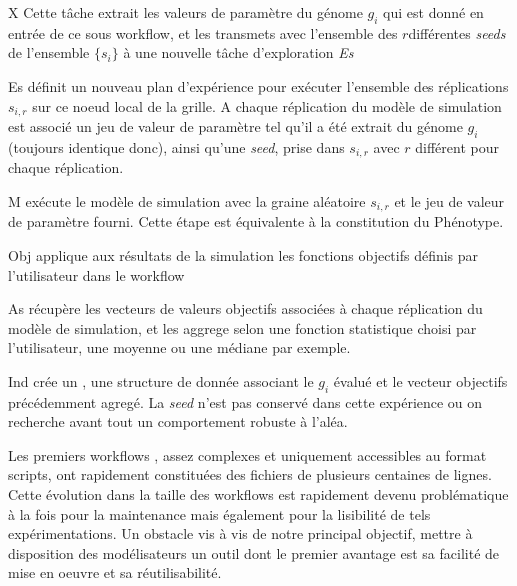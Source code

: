 \begin{myitemize}

\item[X] Cette tâche extrait les valeurs de paramètre du génome $g_i$ qui est donné en entrée de ce sous workflow, et les transmets avec l'ensemble des $r$différentes \textit{seeds} de l'ensemble $\{s_i\}$ à une nouvelle tâche d'exploration \textit{Es} 

\item[Es] définit un nouveau plan d'expérience pour exécuter l'ensemble des réplications $s_{i,r}$ sur ce noeud local de la grille. A chaque réplication du modèle de simulation est associé un jeu de valeur de paramètre tel qu'il a été extrait du génome $g_i$ (toujours identique donc), ainsi qu'une \textit{seed}, prise dans $s_{i,r}$ avec $r$ différent pour chaque réplication.

\item[M] exécute le modèle de simulation avec la graine aléatoire $s_{i,r}$ et le jeu de valeur de paramètre fourni. Cette étape est équivalente à la constitution du Phénotype.

\item[Obj] applique aux résultats de la simulation les fonctions objectifs définis par l'utilisateur dans le workflow

\item[As] récupère les vecteurs de valeurs objectifs associées à chaque réplication du modèle de simulation, et les aggrege selon une fonction statistique choisi par l'utilisateur, une moyenne ou une médiane par exemple.

\item[Ind] crée un , une structure de donnée associant le  $g_i$ évalué et le vecteur objectifs précédemment agregé. La \textit{seed} n'est pas conservé dans cette expérience ou on recherche avant tout un comportement robuste à l'aléa.

\end{myitemize}

Les premiers workflows , assez complexes et uniquement accessibles au format scripts, ont rapidement constituées des fichiers de plusieurs centaines de lignes. Cette évolution dans la taille des workflows est rapidement devenu problématique à la fois pour la maintenance mais également pour la lisibilité de tels expérimentations. Un obstacle vis à vis de notre principal objectif, mettre à disposition des modélisateurs un outil dont le premier avantage est sa facilité de mise en oeuvre et sa réutilisabilité. 

